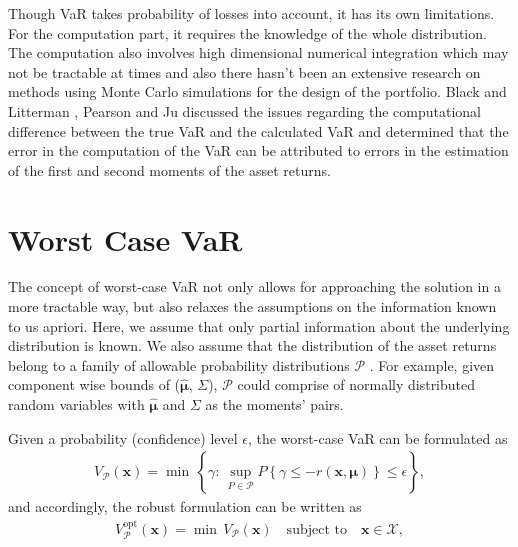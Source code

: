 Though VaR takes probability of losses into account, it has its own limitations. For the computation part, it requires the knowledge of the whole distribution. The computation also involves high dimensional numerical integration which may not be tractable at times and also there hasn't been an extensive research on methods using Monte Carlo simulations \cite{var96} for the design of the portfolio. Black and Litterman \cite{Black}, Pearson and Ju \cite{ju98} discussed the issues regarding the computational difference between the true VaR and the calculated VaR and determined that the error in the computation of the VaR can be attributed to errors in the estimation of the first and second moments of the asset returns.

\section{Worst Case VaR}
The concept of worst-case VaR not only allows for approaching the solution in a more tractable way, but also relaxes the assumptions on the information known to us apriori. Here, we assume that only partial information about the underlying distribution is known. We also assume that the distribution of the asset returns belong to a family of allowable probability distributions $\mathcal{P}$ \cite{ghaoui03}. For example, given component wise bounds of ($\hat{\boldsymbol{\mu}}$,  $\Sigma$), $\mathcal{P}$ could comprise of normally distributed random variables with $\hat{\boldsymbol{\mu}}$ and $\Sigma$ as the moments' pairs. 

Given a probability (confidence) level $\epsilon$, the worst-case VaR can be formulated as 
\begin{equation}
\begin{split}
V_{\mathcal{P}}(\mathbf{x}) = \min \, \left\{\gamma : \, \sup_{P \in \mathcal{P}} P\left\{\gamma \leq -r(\mathbf{x},\boldsymbol{\mu})\right\} \leq \epsilon \right\},
\end{split}
\label{fig:wc_var_basic}
\end{equation}
and accordingly, the robust formulation can be written as 
\begin{equation}
\begin{split}
V_{\mathcal{P}}^{\text{opt}}(\mathbf{x}) = \min \, V_{\mathcal{P}}(\mathbf{x}) \quad \text{subject to} \quad \mathbf{x} \in \mathcal{X}, 
\end{split}
\label{fig:wc_var_general}
\end{equation}

